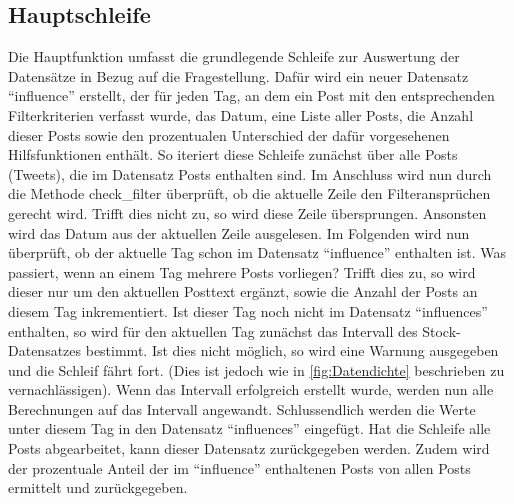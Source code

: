 \documentclass{article}
\begin{document}
\subsection{Hauptschleife}
Die Hauptfunktion umfasst die grundlegende Schleife zur Auswertung der Datensätze in Bezug auf die Fragestellung.
Dafür wird ein neuer Datensatz ``influence'' erstellt, der für jeden Tag, an dem ein Post mit den entsprechenden Filterkriterien verfasst wurde, das Datum, eine Liste aller Posts, die Anzahl dieser Posts sowie den prozentualen Unterschied der dafür vorgesehenen Hilfsfunktionen enthält.
So iteriert diese Schleife zunächst über alle Posts (Tweets), die im Datensatz Posts enthalten sind.
Im Anschluss wird nun durch die Methode check\_filter überprüft, ob die aktuelle Zeile den Filteransprüchen gerecht wird.
Trifft dies nicht zu, so wird diese Zeile übersprungen.
Ansonsten wird das Datum aus der aktuellen Zeile ausgelesen.
Im Folgenden wird nun überprüft, ob der aktuelle Tag schon im Datensatz ``influence'' enthalten ist. Was passiert, wenn an einem Tag mehrere Posts vorliegen? Trifft dies zu, so wird dieser nur um den aktuellen Posttext ergänzt, sowie die Anzahl der Posts an diesem Tag inkrementiert.
Ist dieser Tag noch nicht im Datensatz ``influences'' enthalten, so wird für den aktuellen Tag zunächst das Intervall des Stock-Datensatzes bestimmt.
Ist dies nicht möglich, so wird eine Warnung ausgegeben und die Schleif fährt fort.
(Dies ist jedoch wie in \ref{fig:Datendichte} beschrieben zu vernachlässigen).
Wenn das Intervall erfolgreich erstellt wurde, werden nun alle Berechnungen auf das Intervall angewandt.
Schlussendlich werden die Werte unter diesem Tag in den Datensatz ``influences'' eingefügt.
Hat die Schleife alle Posts abgearbeitet, kann dieser Datensatz zurückgegeben werden.
Zudem wird der prozentuale Anteil der im ``influence'' enthaltenen Posts von allen Posts ermittelt und zurückgegeben.
\end{document}
